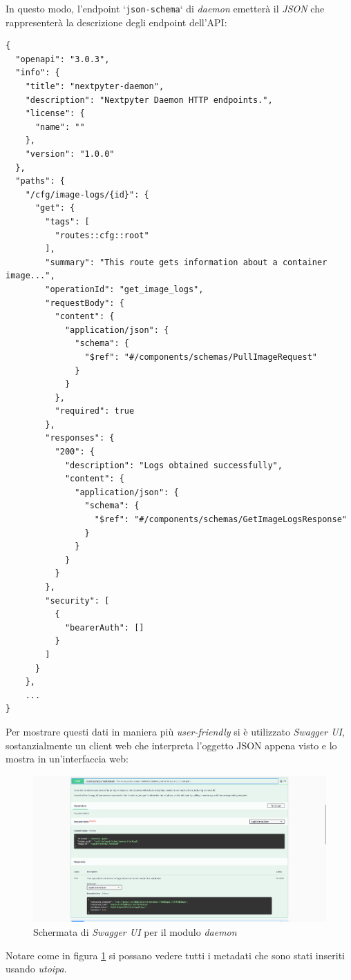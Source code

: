 In questo modo, l'endpoint `\verb|json-schema|` di \textit{daemon} emetterà il \textit{JSON} che rappresenterà la descrizione degli endpoint dell'API:
\begin{verbatim}
{
  "openapi": "3.0.3",
  "info": {
    "title": "nextpyter-daemon",
    "description": "Nextpyter Daemon HTTP endpoints.",
    "license": {
      "name": ""
    },
    "version": "1.0.0"
  },
  "paths": {
    "/cfg/image-logs/{id}": {
      "get": {
        "tags": [
          "routes::cfg::root"
        ],
        "summary": "This route gets information about a container image...",
        "operationId": "get_image_logs",
        "requestBody": {
          "content": {
            "application/json": {
              "schema": {
                "$ref": "#/components/schemas/PullImageRequest"
              }
            }
          },
          "required": true
        },
        "responses": {
          "200": {
            "description": "Logs obtained successfully",
            "content": {
              "application/json": {
                "schema": {
                  "$ref": "#/components/schemas/GetImageLogsResponse"
                }
              }
            }
          }
        },
        "security": [
          {
            "bearerAuth": []
          }
        ]
      }
    },
    ...
}
\end{verbatim}
Per mostrare questi dati in maniera più \textit{user-friendly} si è utilizzato \textit{Swagger UI}, sostanzialmente un client web che interpreta l'oggetto JSON appena visto e lo mostra in un'interfaccia web:
\begin{figure}[h]
    \centering
    \includegraphics[width=1\textwidth]{files/images/swagger-ui-1.png}
    \caption{Schermata di \textit{Swagger UI} per il modulo \textit{daemon}}
    \label{fig:swagger-ui-daemon}
\end{figure}
\newline
Notare come in figura \ref{fig:swagger-ui-daemon} si possano vedere tutti i metadati che sono stati inseriti usando \textit{utoipa}. 
\newpage
